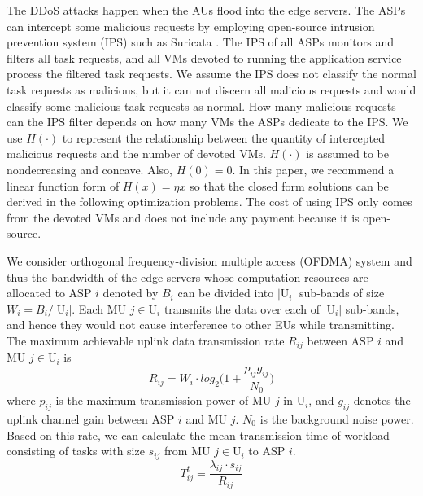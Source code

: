 \documentclass[conference]{IEEEtran}
\begin{document}
The DDoS attacks happen when the AUs flood into the edge servers. The ASPs can intercept some malicious requests by employing open-source intrusion prevention system (IPS) such as Suricata \cite{Suricata}. The IPS of all ASPs monitors and filters all task requests, and all VMs devoted to running the application service process the filtered task requests. We assume the IPS does not classify the normal task requests as malicious, but it can not discern all malicious requests and would classify some malicious task requests as normal. How many malicious requests can the IPS filter depends on how many VMs the ASPs dedicate to the IPS. We use $H(\cdot)$ to represent the relationship between the quantity of intercepted malicious requests and the number of devoted VMs. $H(\cdot)$ is assumed to be nondecreasing and concave. Also, $H(0)=0$. In this paper, we recommend a linear function form of $H(x) = \eta{x}$ so that the closed form solutions can be derived in the following optimization problems. The cost of using IPS only comes from the devoted VMs and does not include any payment because it is open-source.

We consider orthogonal frequency-division multiple access (OFDMA) system and thus the bandwidth of the edge servers whose computation resources are allocated to ASP $i$ denoted by $B_i$ can be divided into $|\mathrm{U}_i|$ sub-bands of size $W_{i} = B_i/|\mathrm{U}_i|$. Each MU $j\in \mathrm{U}_i$ transmits the data over each of $|\mathrm{U}_i|$ sub-bands, and hence they would not cause interference to other EUs while transmitting. The maximum achievable uplink data transmission rate $R_{ij}$ between ASP $i$ and MU $j \in \mathrm{U}_i$ is 
\begin{equation} \label{eqn:shannon}
R_{ij}=W_i \cdot log_2\Big(1+\frac{p_{ij}g_{ij}}{N_{0}}\Big)
\end{equation}
where $p_{ij}$ is the maximum transmission power of MU $j$ in $\mathrm{U}_i$, and $g_{ij}$ denotes the uplink channel gain between ASP $i$ and MU $j$. $N_0$ is the background noise power. Based on this rate, we can calculate the mean transmission time of workload consisting of tasks with size $s_{ij}$ from MU $j \in \mathrm{U}_i$ to ASP $i$. 
\begin{equation} 
T_{ij}^t=\frac{\lambda_{ij} \cdot s_{ij}}{R_{ij}}
\end{equation}
\end{document}

